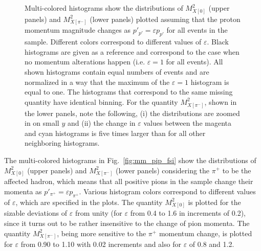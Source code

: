 \begin{figure}[htp]
\begin{center}
\caption{\small Multi-colored histograms show the distributions of $M_{X[0]}^{2}$ (upper panels) and $M_{X[\pi^{-}]}^{2}$ (lower panels) plotted assuming that the proton momentum magnitude changes as $p'_{p'} = \varepsilon p_{p'}$ for all events in the sample. Different colors correspond to different values of $\varepsilon$. Black histograms are given as a reference and correspond to the case when no momentum alterations happen (i.e. $\varepsilon = 1$ for all events). All shown histograms contain equal numbers of events and are normalized in a way that the maximum of the $\varepsilon=1$ histogram is equal to one. The histograms that correspond to the same missing quantity have identical binning. For the quantity $M_{X[\pi^{-}]}^{2}$, shown in the lower panels, note the following, (i) the distributions are zoomed in on small $y$ and (ii) the change in $\varepsilon$ values between the magenta and cyan histograms is five times larger than for all other neighboring histograms. } \label{fig:mm_pr_fsi}
\end{center}
\end{figure}



The multi-colored histograms in Fig.~\ref{fig:mm_pip_fsi} show the distributions of $M_{X[0]}^{2}$ (upper panels) and $M_{X[\pi^{-}]}^{2}$ (lower panels) considering the $\pi^{+}$ to be the affected hadron, which means that all positive pions in the sample change their momenta as $p'_{\pi^{+}} = \varepsilon p_{\pi^{+}}$. Various histogram colors correspond to different values of $\varepsilon$, which are specified in the plots. The quantity $M_{X[0]}^{2}$ is plotted for the sizable deviations of $\varepsilon$ from unity (for $\varepsilon$ from 0.4 to 1.6 in increments of 0.2), since it turns out to be rather insensitive to the change of pion momenta. The quantity $M_{X[\pi^{-}]}^{2}$, being more sensitive to the $\pi^{+}$ momentum change, is plotted for $\varepsilon$ from 0.90 to 1.10 with 0.02 increments and also for $\varepsilon$ of 0.8 and 1.2. 



